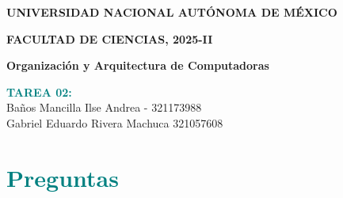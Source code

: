 \documentclass[a4paper,12pt]{article}
\begin{document}
\begin{titlepage}
    \centering
    \vspace*{1cm}
    \textbf{UNIVERSIDAD NACIONAL AUTÓNOMA DE MÉXICO}
    
    \vspace{0.5cm}
    \textbf{FACULTAD DE CIENCIAS, 2025-II}
    
    \vspace{0.5cm}
    \textbf{Organización y Arquitectura de Computadoras}
    
    \vspace{5 cm}
    \textbf{\LARGE \textcolor{teal}{TAREA 02:}}
    \vspace{3cm}\\

    \Large Baños Mancilla Ilse Andrea - 321173988\\
    \vspace{1 cm}
    \Large Gabriel Eduardo Rivera Machuca 321057608
    
  
    \vspace{1cm}
\end{titlepage}

\section*{\textcolor{teal}{Preguntas}}
\end{document}
